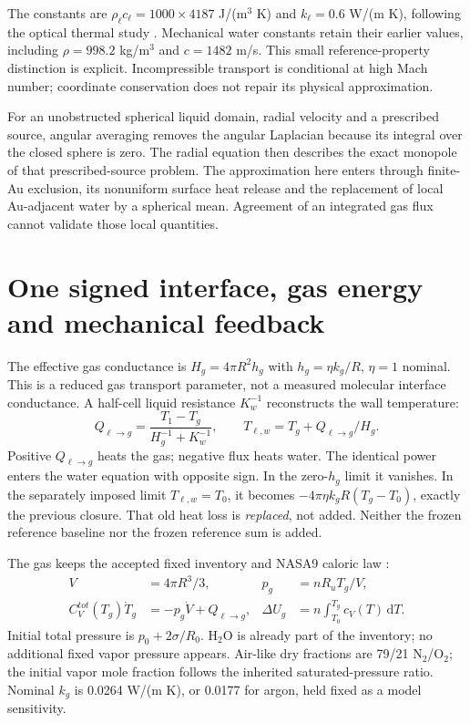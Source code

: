 \documentclass[10pt,letterpaper]{article}
\newcommand{\dd}{\mathrm{d}}
\begin{document}
The constants are $\rho_\ell c_\ell=1000\times4187$ J/(m$^3$ K) and $k_\ell=0.6$ W/(m K), following the optical thermal study \cite{baffou}. Mechanical water constants retain their earlier values, including $\rho=998.2$ kg/m$^3$ and $c=1482$ m/s. This small reference-property distinction is explicit. Incompressible transport is conditional at high Mach number; coordinate conservation does not repair its physical approximation.

For an unobstructed spherical liquid domain, radial velocity and a prescribed source, angular averaging removes the angular Laplacian because its integral over the closed sphere is zero. The radial equation then describes the exact monopole of that prescribed-source problem. The approximation here enters through finite-Au exclusion, its nonuniform surface heat release and the replacement of local Au-adjacent water by a spherical mean. Agreement of an integrated gas flux cannot validate those local quantities.
\clearpage
\section{One signed interface, gas energy and mechanical feedback}
The effective gas conductance is $H_g=4\pi R^2h_g$ with $h_g=\eta k_g/R$, $\eta=1$ nominal. This is a reduced gas transport parameter, not a measured molecular interface conductance. A half-cell liquid resistance $K_w^{-1}$ reconstructs the wall temperature:
\begin{equation}
Q_{\ell\to g}=\frac{T_1-T_g}{H_g^{-1}+K_w^{-1}},\qquad
T_{\ell,w}=T_g+Q_{\ell\to g}/H_g .
\end{equation}
Positive $Q_{\ell\to g}$ heats the gas; negative flux heats water. The identical power enters the water equation with opposite sign. In the zero-$h_g$ limit it vanishes. In the separately imposed limit $T_{\ell,w}=T_0$, it becomes $-4\pi\eta k_gR(T_g-T_0)$, exactly the previous closure. That old heat loss is \emph{replaced}, not added. Neither the frozen reference baseline nor the frozen reference sum is added.

The gas keeps the accepted fixed inventory and NASA9 caloric law \cite{nasa}:
\begin{align}
V&=4\pi R^3/3,&p_g&=nR_uT_g/V,\\
C_V^{tot}(T_g)\dot T_g&=-p_g\dot V+Q_{\ell\to g},&
\Delta U_g&=n\int_{T_0}^{T_g}c_V(T)\,\dd T.
\end{align}
Initial total pressure is $p_0+2\sigma/R_0$. H$_2$O is already part of the inventory; no additional fixed vapor pressure appears. Air-like dry fractions are 79/21 N$_2$/O$_2$; the initial vapor mole fraction follows the inherited saturated-pressure ratio. Nominal $k_g$ is 0.0264 W/(m K), or 0.0177 for argon, held fixed as a model sensitivity.
\end{document}
